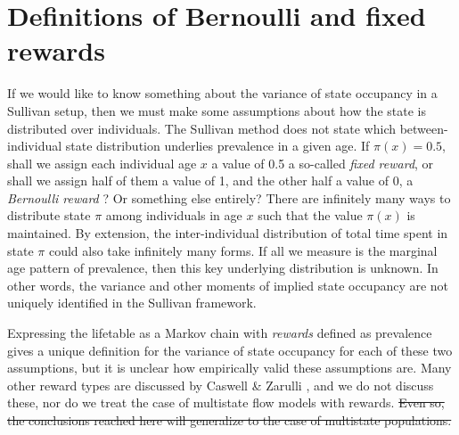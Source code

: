 \documentclass{bmcart}
\begin{document}
\section{Definitions of Bernoulli and fixed rewards}
If we would like to know something about the variance of state occupancy in a Sullivan setup, then we must make some assumptions about how the state is distributed over individuals. The Sullivan method does not state which between-individual state distribution underlies prevalence in a given age. If $\pi(x) = 0.5$, shall we assign each individual age $x$ a value of 0.5 a so-called \emph{fixed reward}, or shall we assign half of them a value of 1, and the other half a value of 0, a \emph{Bernoulli reward} \citep{caswell2018matrix}? Or something else entirely? There are infinitely many ways to distribute state $\pi$ among individuals in age $x$ such that the value $\pi(x)$ is maintained. By extension, the inter-individual distribution of total time spent in state $\pi$ could also take infinitely many forms. If all we measure is the marginal age pattern of prevalence, then this key underlying distribution is unknown. In other words, the variance and other moments of implied state occupancy are not uniquely identified in the Sullivan framework. 

Expressing the lifetable as a Markov chain with \emph{rewards} defined as prevalence gives a unique definition for the variance of state occupancy for each of these two assumptions, but it is unclear how empirically valid these assumptions are. Many other reward types are discussed by Caswell \& Zarulli \cite{caswell2018matrix}, and we do not discuss these, nor do we treat the case of multistate flow models with rewards. \sout{Even so, the conclusions reached here will generalize to the case of multistate populations.}

\end{document}

